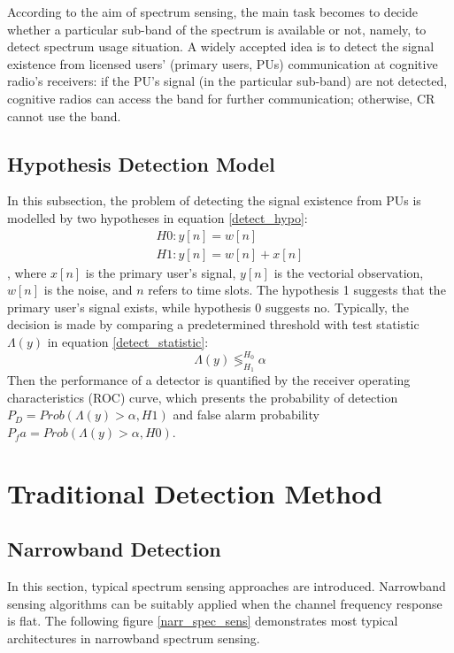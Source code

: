 According to the aim of spectrum sensing, the main task becomes to decide whether a particular sub-band of the spectrum is available or not, namely, to detect spectrum usage situation. A widely accepted idea is to detect the signal existence from licensed users' (primary users, PUs) communication at cognitive radio's receivers: if the PU's signal (in the particular sub-band) are not detected, cognitive radios can access the band for further communication; otherwise, CR cannot use the band. 

\subsection{Hypothesis Detection Model}

In this subsection, the problem of detecting the signal existence from PUs is modelled by two hypotheses in equation \ref{detect_hypo}: 
\begin{equation}
\label{detect_hypo}
\begin{aligned}
H0: y[n] = w[n]   \\
H1: y[n] = w[n] + x[n] 
\end{aligned}
\end{equation}
, where $x[n]$ is the primary user's signal, $y[n]$ is the vectorial observation, $w[n]$ is the noise, and $n$ refers to time slots. The hypothesis 1 suggests that the primary user's signal exists, while hypothesis 0 suggests no. Typically, the decision is made by comparing a predetermined threshold with test statistic $\Lambda(y)$ in equation \ref{detect_statistic}: 
\begin{equation}
\label{detect_statistic}
\Lambda(y) \mathop{\lessgtr}_{H_1}^{H_0} \alpha
\end{equation}
Then the performance of a detector is quantified by the receiver operating characteristics (ROC) curve, which presents the probability of detection $P_D = Prob(\Lambda(y) > \alpha, H1)$ and false alarm probability $P_fa = Prob(\Lambda(y) > \alpha, H0)$. 

\section{Traditional Detection Method}

\subsection{Narrowband Detection}

In this section, typical spectrum sensing approaches are introduced. Narrowband sensing algorithms can be suitably applied when the channel frequency response is flat. The following figure \ref{narr_spec_sens} demonstrates most typical architectures in narrowband spectrum sensing.

